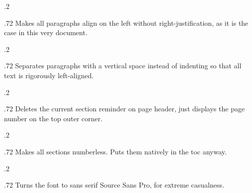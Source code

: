 \documentclass[
	a4paper,
	raggedright,
	twoside,
	12pt,
	colorful,
]{tufte-style-article}
\begin{document}
\medskip
\begin{minipagewithmarginpars}[t]{.2\textwidth}
	\raggedleft
\end{minipagewithmarginpars}\hfill%
\begin{minipagewithmarginpars}[t]{.72\textwidth}
	Makes all paragraphs align on the left without right-justification, as it is the case in this very document. \\
\end{minipagewithmarginpars}
\smallskip
\begin{minipagewithmarginpars}[t]{.2\textwidth}
	\raggedleft
\end{minipagewithmarginpars}\hfill%
\begin{minipagewithmarginpars}[t]{.72\textwidth}
	Separates paragraphs with a vertical space instead of indenting so that all text is rigorously left-aligned.
\end{minipagewithmarginpars}
\smallskip
\begin{minipagewithmarginpars}[t]{.2\textwidth}
	\raggedleft
\end{minipagewithmarginpars}\hfill%
\begin{minipagewithmarginpars}[t]{.72\textwidth}
	Deletes the current section reminder on page header, just displays the page number on the top outer corner.
\end{minipagewithmarginpars}
\smallskip
\begin{minipagewithmarginpars}[t]{.2\textwidth}
	\raggedleft
\end{minipagewithmarginpars}\hfill%
\begin{minipagewithmarginpars}[t]{.72\textwidth}
	Makes all sections numberless. Puts them natively in the toc anyway.
\end{minipagewithmarginpars}
\smallskip
\begin{minipagewithmarginpars}[t]{.2\textwidth}
	\raggedleft
\end{minipagewithmarginpars}\hfill%
\begin{minipagewithmarginpars}[t]{.72\textwidth}
	Turns the font to sans serif Source Sans Pro, for extreme casualness.
\end{minipagewithmarginpars}
\end{document}
